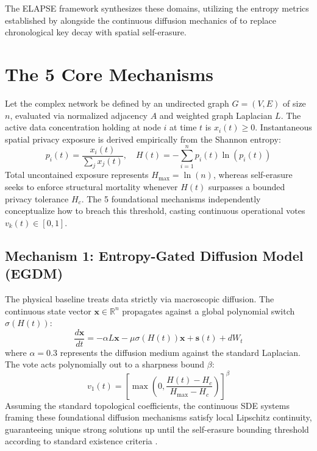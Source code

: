 \documentclass[review,12pt]{elsarticle}
\begin{document}
The ELAPSE framework synthesizes these domains, utilizing the entropy metrics established by \cite{zhao2024entropy} alongside the continuous diffusion mechanics of \cite{eliasof2024graph} to replace chronological key decay with spatial self-erasure.

\section{The 5 Core Mechanisms}
\label{sec:mechanisms}

Let the complex network be defined by an undirected graph $G = (V, E)$ of size $n$, evaluated via normalized adjacency $A$ and weighted graph Laplacian $L$. The active data concentration holding at node $i$ at time $t$ is $x_i(t) \ge 0$. Instantaneous spatial privacy exposure is derived empirically from the Shannon entropy:
\begin{equation}
    p_i(t) = \frac{x_i(t)}{\sum_{j} x_j(t)}, \quad H(t) = -\sum_{i=1}^n p_i(t) \ln(p_i(t))
\end{equation}
Total uncontained exposure represents $H_{\max} = \ln(n)$, whereas self-erasure seeks to enforce structural mortality whenever $H(t)$ surpasses a bounded privacy tolerance $H_c$. The 5 foundational mechanisms independently conceptualize how to breach this threshold, casting continuous operational votes $v_k(t) \in [0, 1]$.

\subsection{Mechanism 1: Entropy-Gated Diffusion Model (EGDM)}
The physical baseline treats data strictly via macroscopic diffusion. The continuous state vector $\mathbf{x} \in \mathbb{R}^n$ propagates against a global polynomial switch $\sigma(H(t))$:
\begin{equation}
    \frac{d\mathbf{x}}{dt} = -\alpha L \mathbf{x} - \mu \sigma(H(t)) \mathbf{x} + \mathbf{s}(t) + dW_t
\end{equation}
where $\alpha=0.3$ represents the diffusion medium against the standard Laplacian. The vote acts polynomially out to a sharpness bound $\beta$:
\begin{equation}
    v_1(t) = \left[ \max\left(0, \frac{H(t) - H_c}{H_{\max} - H_c}\right) \right]^\beta
\end{equation}
Assuming the standard topological coefficients, the continuous SDE systems framing these foundational diffusion mechanisms satisfy local Lipschitz continuity, guaranteeing unique strong solutions up until the self-erasure bounding threshold according to standard existence criteria \cite{oksendal2003stochastic}.
\end{document}
